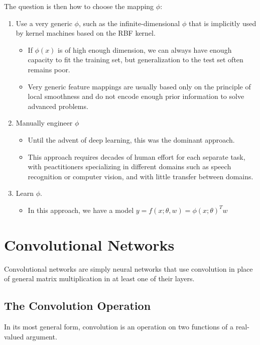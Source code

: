 \documentclass{report}
\begin{document}
\noindent The question is then how to choose the mapping $\phi$:
\begin{enumerate}
	\item Use a very generic $\phi$, such as the infinite-dimensional $\phi$ that is implicitly used by kernel machines based on the RBF kernel.\newline
    	\begin{itemize}
    		\item If $\phi(x)$ is of high enough dimension, we can always have enough capacity to fit the training set, but generalization to the test set often remains poor.
            \item Very generic feature mappings are usually based only on the principle of local smoothness and do not encode enough prior information to solve advanced problems.
    	\end{itemize}
    \item Manually engineer $\phi$\newline
    	\begin{itemize}
    		\item Until the advent of deep learning, this was the dominant approach.
            \item This approach requires decades of human effort for each separate task, with peactitioners specializing in different domains such as speech recognition or computer vision, and with little transfer between domains.
    	\end{itemize}
    \item Learn $\phi$.\newline
    	\begin{itemize}
    		\item In this approach, we have a model $y=f(x; \theta, w) = \phi(x; \theta)^Tw$
    	\end{itemize}
\end{enumerate}

\chapter{Convolutional Networks}
Convolutional networks are simply neural networks that use convolution in place of general matrix multiplication in at least one of their layers.

\section{The Convolution Operation}
In its most general form, convolution is an operation on two functions of a real-valued argument.\newline
\end{document}
